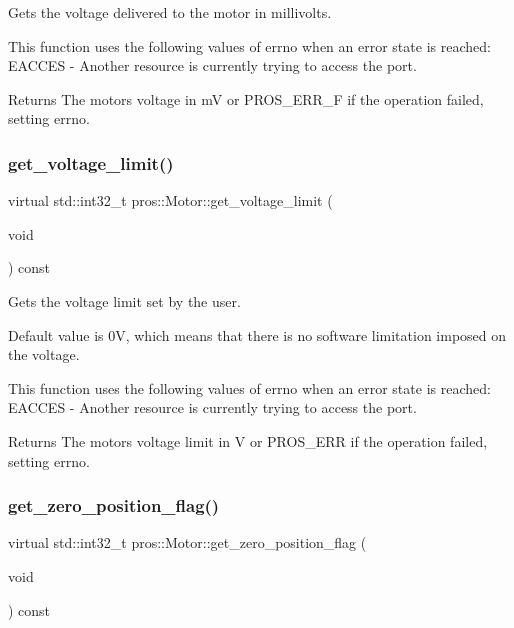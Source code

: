 Gets the voltage delivered to the motor in millivolts. 

This function uses the following values of errno when an error state is reached\+: E\+A\+C\+C\+ES -\/ Another resource is currently trying to access the port.

\begin{DoxyReturn}{Returns}
The motor\textquotesingle{}s voltage in mV or P\+R\+O\+S\+\_\+\+E\+R\+R\+\_\+F if the operation failed, setting errno. 
\end{DoxyReturn}
\mbox{\label{classpros_1_1Motor_a2afbe15bed764ca6d21f1e7c6c8da700}} 
\subsubsection{\texorpdfstring{get\_voltage\_limit()}{get\_voltage\_limit()}}
{\footnotesize\ttfamily virtual std\+::int32\+\_\+t pros\+::\+Motor\+::get\+\_\+voltage\+\_\+limit (\begin{DoxyParamCaption}\item[{void}]{ }\end{DoxyParamCaption}) const\hspace{0.3cm}{\ttfamily [virtual]}}



Gets the voltage limit set by the user. 

Default value is 0V, which means that there is no software limitation imposed on the voltage.

This function uses the following values of errno when an error state is reached\+: E\+A\+C\+C\+ES -\/ Another resource is currently trying to access the port.

\begin{DoxyReturn}{Returns}
The motor\textquotesingle{}s voltage limit in V or P\+R\+O\+S\+\_\+\+E\+RR if the operation failed, setting errno. 
\end{DoxyReturn}
\mbox{\label{classpros_1_1Motor_a589a3cbb397ba065c30c1f16bb3f08a7}} 
\subsubsection{\texorpdfstring{get\_zero\_position\_flag()}{get\_zero\_position\_flag()}}
{\footnotesize\ttfamily virtual std\+::int32\+\_\+t pros\+::\+Motor\+::get\+\_\+zero\+\_\+position\+\_\+flag (\begin{DoxyParamCaption}\item[{void}]{ }\end{DoxyParamCaption}) const\hspace{0.3cm}{\ttfamily [virtual]}}



